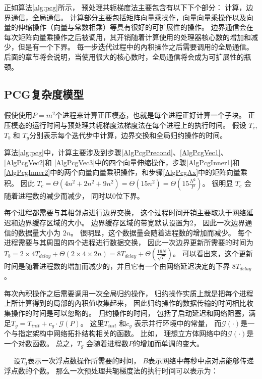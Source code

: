  
正如算法\ref{alg:pcg}所示， 预处理共轭梯度法主要包含有以下下个部分： 计算，边界通信，全局通信。
计算部分主要包括矩阵向量乘操作，向量向量乘操作以及向量的伸缩操作（向量与常数相乘）等具有很好的可扩展性的操作。 
边界通信会在每次矩阵向量乘操作之后被调用，其开销随着计算使用的处理器核心数的增加和减少，但是有一个下界。 
每一步迭代过程中的內积操作之后需要调用的全局通信。后面的章节将会说明，当使用很大的核心数时，全局通信将会成为可扩展性的瓶颈。
 
\subsection{PCG复杂度模型}
\label{solver:pcgComplex}
假使使用$P=m^2$个进程来计算正压模态，也就是每个进程正好计算一个子块。 
正压模态的运行时间与预处理共轭梯度法梯度法在每个进程上的执行时间。 
假设 $T_c$, $T_b$ 和 $T_g$分别表示每个迭代步中计算，边界交换和全局归约操作的时间。 

算法\ref{alg:pcg}中，计算主要涉及到步骤\ref{AlgPcgPrecond}、\ref{AlgPcgVec1}、\ref{AlgPcgVec2}和 \ref{AlgPcgVec3}中的四个向量伸缩操作，步骤\ref{AlgPcgInner1}和\ref{AlgPcgInner2}中的两个向量向量乘积操作，和步骤\ref{AlgPcgAx}中的矩阵向量乘积。 
因此 $T_c= \Theta (4 n^2 +2n^2+ 9n^2) = \Theta (15n^2) =\Theta(15\frac{N^2}{P})$。 
很明显 $T_c$ 会随着进程数的减少而减少， 同时以0位下界。 


每个进程都需要与其相邻点进行边界交换， 这个过程时间开销主要取决于网络延迟和边界缓存区域的大小。 
边界缓存区域的带宽默认设置为2， 因此一次边界通信的数据量大小为 $2n$。 
很明显，这个数据量会随着进程数的增加而减少。 
每个进程需要与其周围的四个进程进行数据交换， 因此一次边界更新所需要的时间为$T_b =2\times4T_{delay} +\Theta (2\times4\times 2n)=8T_{delay} +\Theta (\frac{16N}{\sqrt{P}})$。 
可以看出来，这个更新时间是随着进程数的增加而减少的，并且它有一个由网络延迟决定的下界 $8T_{delay}$。 

 
每次內积操作之后需要调用一次全局归约操作， 归约操作实质上就是把每个进程上所计算得到的局部的內积值收集起来，
因此归约操作的数据传输的时间相比收集操作的时间是可以忽略的。 
归约操作的时间， 包括了启动延迟和网络阻塞，满足$T_g= T_{init}+ c_g\cdot \mathcal{G}(P)$。 
这里$T_{init}$ 和$c_g$ 表示并行环境中的常量， 而$\mathcal{G}(\cdot)$是一个与指定架构中网络拓扑结构相关的函数。 
比如， 理想立方体网络中的$\mathcal{G}(\cdot)$是一个对数函数。 
总之，$T_g$ 会随着进程数$P$的增加而单调的变大。 
 

　
设$T_0$表示一次浮点数操作所需要的时间， $B$表示网络中每秒中点对点能够传递浮点数的个数。 
那么一次预处理共轭梯度法的执行时间可以表示为：

